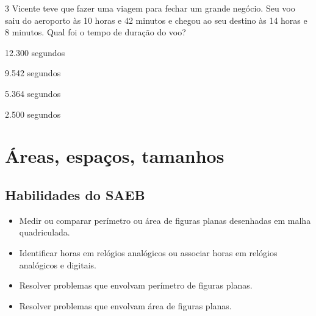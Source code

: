 \num{3} Vicente teve que fazer uma viagem para fechar um grande negócio. Seu
voo saiu do aeroporto às 10 horas e 42 minutos e chegou ao seu destino
às 14 horas e 8 minutos. Qual foi o tempo de duração do voo?

\begin{minipage}{.5\textwidth}
\begin{escolha}
\item
  12.300 segundos
\item
  9.542 segundos
\item
  5.364 segundos
\item
  2.500 segundos
\end{escolha}
\end{minipage}


\chapter{Áreas, espaços, tamanhos}

\section{Habilidades do SAEB}

\begin{itemize}
\item Medir ou comparar perímetro ou área de figuras planas desenhadas em
malha quadriculada.

\item Identificar horas em relógios analógicos ou associar horas em relógios
analógicos e digitais.

\item Resolver problemas que envolvam perímetro de figuras planas.

\item Resolver problemas que envolvam área de figuras planas.
\end{itemize}

